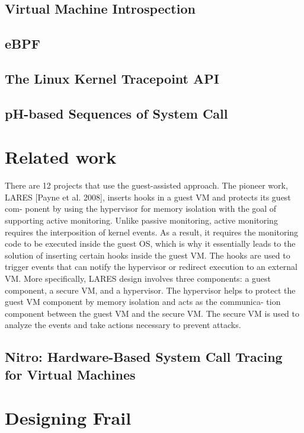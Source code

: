 \documentclass{report}
\begin{document}
\begin{spacing}{1.5}
\section{Virtual Machine Introspection}
\section{eBPF}
\section{The Linux Kernel Tracepoint API}
\section{pH-based Sequences of System Call}


\chapter{Related work}

{\large


There are 12 projects that use the guest-assisted approach. The pioneer
work, LARES [Payne et al. 2008], inserts hooks in a guest VM and protects its guest com-
ponent by using the hypervisor for memory isolation with the goal of supporting active
monitoring. Unlike passive monitoring, active monitoring requires the interposition of kernel events. As a result, it requires the monitoring code to be executed inside the guest OS, which is why it essentially leads to the solution of inserting certain hooks inside the guest VM. The hooks are used to trigger events that can notify the hypervisor
or redirect execution to an external VM. More specifically, LARES design involves three
components: a guest component, a secure VM, and a hypervisor. The hypervisor helps
to protect the guest VM component by memory isolation and acts as the communica-
tion component between the guest VM and the secure VM. The secure VM is used to
analyze the events and take actions necessary to prevent attacks.


}

\section{Nitro: Hardware-Based System Call Tracing for Virtual Machines}

\chapter{Designing Frail}

\end{spacing}
\end{document}
